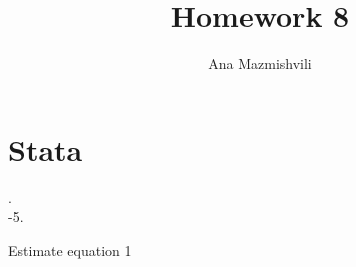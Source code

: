 \documentclass{article}
\title{Homework 8}
\author{Ana Mazmishvili}
\begin{document}
  
\maketitle

\section{Stata}
. 
\\

-5. 


\begin{table}[h]
    \centering
    
    \caption{Estimate equation 1}
    \label{tab:reg1}
\end{table}
\clearpage
\end{document}

